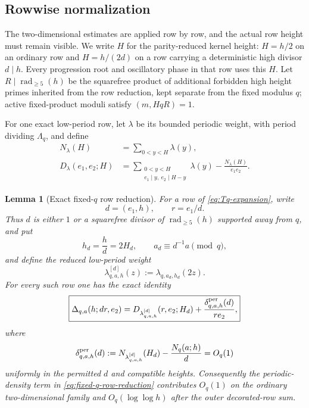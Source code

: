 \documentclass[11pt]{article}
\newtheorem{lemma}[theorem]{Lemma}
\theoremstyle{definition}
\theoremstyle{remark}
\newcommand{\1}{\mathbf 1}
\newcommand{\e}{\mathrm e}
\begin{document}
\subsection{Rowwise normalization}\label{sec:row-contract}
The two-dimensional estimates are applied row by row, and the actual row
height must remain visible.  We write $H$ for the parity-reduced kernel
height: $H=h/2$ on an ordinary row and $H=h/(2d)$ on a row carrying a
deterministic high divisor $d\mid h$.  Every progression root and oscillatory
phase in that row uses this $H$.  Let
$R\mid\operatorname{rad}_{\ge5}(h)$ be the squarefree product of additional
forbidden high height primes inherited from the row reduction, kept separate
from the fixed modulus $q$; active fixed-product moduli satisfy $(m,HqR)=1$.

For one exact low-period row, let $\lambda$ be its bounded periodic weight,
with period dividing $\Lambda_q$, and define
\begin{align}
N_\lambda(H)&=\sum_{0<y<H}\lambda(y),\label{eq:Nlambda}\\
D_\lambda(e_1,e_2;H)
&=\sum_{\substack{0<y<H\\e_1\mid y,\ e_2\mid H-y}}\lambda(y)
 -\frac{N_\lambda(H)}{e_1e_2}.\label{eq:Dlambda}
\end{align}

\begin{lemma}[Exact fixed-$q$ row reduction]\label{lem:fixed-q-row-reduction}
For a row of \eqref{eq:Tq-expansion}, write
\[
d=(e_1,h),\qquad r=e_1/d.
\]
Thus $d$ is either $1$ or a squarefree divisor of
$\operatorname{rad}_{\ge5}(h)$ supported away from $q$, and put
\[
h_d=\frac hd=2H_d,
\qquad
 a_d\equiv d^{-1}a\pmod q,
\]
and define the reduced low-period weight
\begin{equation}\label{eq:reduced-low-weight-q}
\lambda^{[d]}_{q,a,h}(z):=\lambda_{q,a_d,h_d}(2z).
\end{equation}
For every such row one has the exact identity
\begin{equation}\label{eq:fixed-q-row-reduction}
\boxed{
\Delta_{q,a}(h;dr,e_2)
=D_{\lambda^{[d]}_{q,a,h}}(r,e_2;H_d)
+\frac{\delta^{\rm per}_{q,a,h}(d)}{r e_2},
}
\end{equation}
where
\begin{equation}\label{eq:periodic-density-delta-q}
\delta^{\rm per}_{q,a,h}(d)
:=N_{\lambda^{[d]}_{q,a,h}}(H_d)-\frac{N_q(a;h)}d
=O_q(1)
\end{equation}
uniformly in the permitted $d$ and compatible heights.  Consequently the
periodic-density term in \eqref{eq:fixed-q-row-reduction} contributes
$O_q(1)$ on the ordinary two-dimensional family and
$O_q(\log\log h)$ after the outer decorated-row sum.
\end{lemma}
\end{document}
